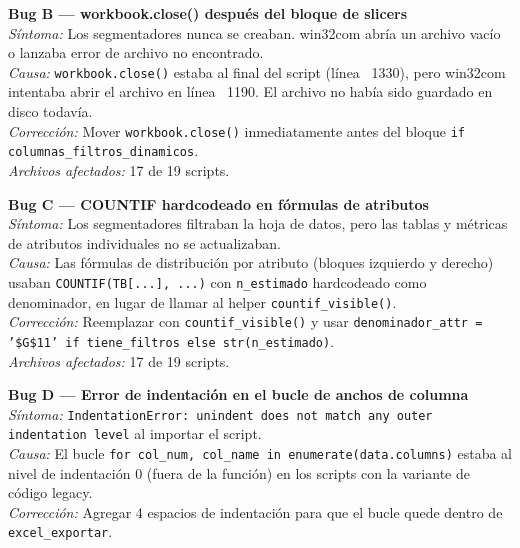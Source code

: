 \documentclass[12pt, letterpaper]{article}
\begin{document}
\begin{bugbox}
\textbf{Bug B — workbook.close() después del bloque de slicers}\\[4pt]
\textit{Síntoma:} Los segmentadores nunca se creaban. win32com abría un archivo vacío o lanzaba error de archivo no encontrado.\\[4pt]
\textit{Causa:} \texttt{workbook.close()} estaba al final del script (línea ~1330), pero win32com intentaba abrir el archivo en línea ~1190. El archivo no había sido guardado en disco todavía.\\[4pt]
\textit{Corrección:} Mover \texttt{workbook.close()} inmediatamente antes del bloque \texttt{if columnas\_filtros\_dinamicos}.\\[4pt]
\textit{Archivos afectados:} 17 de 19 scripts.
\end{bugbox}

\begin{bugbox}
\textbf{Bug C — COUNTIF hardcodeado en fórmulas de atributos}\\[4pt]
\textit{Síntoma:} Los segmentadores filtraban la hoja de datos, pero las tablas y métricas de atributos individuales no se actualizaban.\\[4pt]
\textit{Causa:} Las fórmulas de distribución por atributo (bloques izquierdo y derecho) usaban \texttt{COUNTIF(TB[...], ...)} con \texttt{n\_estimado} hardcodeado como denominador, en lugar de llamar al helper \texttt{countif\_visible()}.\\[4pt]
\textit{Corrección:} Reemplazar con \texttt{countif\_visible()} y usar \texttt{denominador\_attr = '\$G\$11' if tiene\_filtros else str(n\_estimado)}.\\[4pt]
\textit{Archivos afectados:} 17 de 19 scripts.
\end{bugbox}

\begin{bugbox}
\textbf{Bug D — Error de indentación en el bucle de anchos de columna}\\[4pt]
\textit{Síntoma:} \texttt{IndentationError: unindent does not match any outer indentation level} al importar el script.\\[4pt]
\textit{Causa:} El bucle \texttt{for col\_num, col\_name in enumerate(data.columns)} estaba al nivel de indentación 0 (fuera de la función) en los scripts con la variante de código legacy.\\[4pt]
\textit{Corrección:} Agregar 4 espacios de indentación para que el bucle quede dentro de \texttt{excel\_exportar}.
\end{bugbox}
\end{document}
